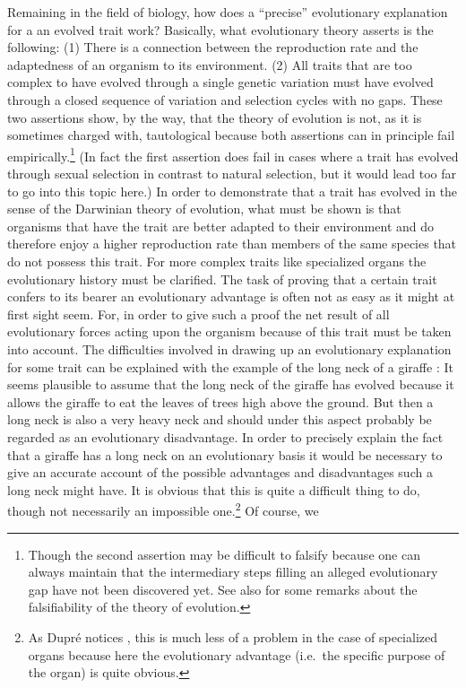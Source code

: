 Remaining in the field of biology, how does a ``precise'' evolutionary
explanation for a an evolved trait work? Basically, what evolutionary theory
asserts is the following: (1) There is a connection between the reproduction
rate and the adaptedness of an organism to its environment. (2) All traits that
are too complex to have evolved through a single genetic variation must
have evolved through a closed sequence of variation and selection cycles
with no gaps. These two assertions show, by the way, that the theory of
evolution is not, as it is sometimes charged with,
tautological\label{tautologyCharge} because both assertions can in principle
fail empirically.\footnote{Though the second assertion may be difficult to
falsify because one can always maintain that the intermediary steps filling
an alleged evolutionary gap have not been discovered yet. See also \cite[p.\ 
  335]{schurz:2001} for some remarks about the falsifiability of the theory of
  evolution.} (In fact the first assertion does fail in cases where a trait
has evolved through sexual selection in contrast to natural selection, but it
would lead too far to go into this topic here.) In order to demonstrate that a trait
has evolved in the sense of the Darwinian theory of evolution, what must be
shown is that organisms that have the trait are better adapted to their
environment and do therefore enjoy a higher reproduction rate than members of
the same species that do not possess this trait.  For more complex traits like
specialized organs the evolutionary history must be clarified. The task of
proving that a certain trait confers to its bearer an evolutionary advantage
is often not as easy as it might at first sight seem.  For, in order to give
such a proof the net result of all evolutionary forces acting upon the
organism because of this trait must be taken into account. The difficulties
involved in drawing up an evolutionary explanation for some trait can be
explained with the example of the long neck of a giraffe \cite[p.\ 
37-40]{dupre:2003}: It seems plausible to assume that the long neck of the
giraffe has evolved because it allows the giraffe to eat the leaves of trees
high above the ground. But then a long neck is also a very heavy neck and
should under this aspect probably be regarded as an evolutionary
disadvantage.  In order to precisely explain the fact that a giraffe has a
long neck on an evolutionary basis it would be necessary to give an accurate
account of the possible advantages and disadvantages such a long neck
might have. It is obvious that this is quite a
difficult thing to do, though not necessarily an impossible one.\footnote{As
  Dupré notices \cite[p.\   38]{dupre:2003}, this is much less of a problem in
  the case of specialized organs because here the evolutionary advantage
  (i.e.\ the specific purpose of the organ) is quite obvious.} Of course, we
